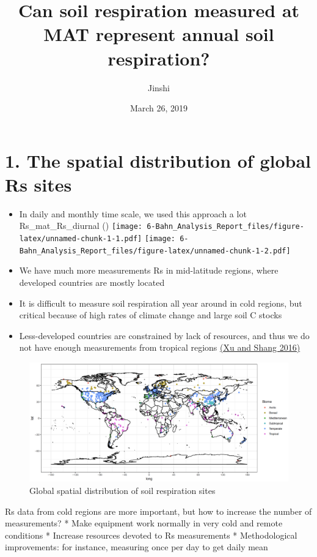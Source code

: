 \documentclass[]{article}
\title{Can soil respiration measured at MAT represent annual soil respiration?}
\author{Jinshi}
\date{March 26, 2019}
\begin{document}
\maketitle

\hypertarget{the-spatial-distribution-of-global-rs-sites}{%
\section{1. The spatial distribution of global Rs
sites}\label{the-spatial-distribution-of-global-rs-sites}}

\begin{itemize}
\item
  In daily and monthly time scale, we used this approach a lot
  Rs\_mat\_Rs\_diurnal ()
  \texttt{[image: 6-Bahn\_Analysis\_Report\_files/figure-latex/unnamed-chunk-1-1.pdf]}
  \texttt{[image: 6-Bahn\_Analysis\_Report\_files/figure-latex/unnamed-chunk-1-2.pdf]}
\item
  We have much more measurements Rs in mid-latitude regions, where
  developed countries are mostly located
\item
  It is difficult to measure soil respiration all year around in cold
  regions, but critical because of high rates of climate change and
  large soil C stocks
\item
  Less-developed countries are constrained by lack of resources, and
  thus we do not have enough measurements from tropical regions
  \href{http://dx.doi.org/10.1016/j.jplph.2016.08.007}{(Xu and Shang
  2016)}
\end{itemize}

\begin{figure}
\centering
\includegraphics{SRDB_V4_Fig1.png}
\caption{Global spatial distribution of soil respiration sites}
\end{figure}

Rs data from cold regions are more important, but how to increase the
number of measurements? * Make equipment work normally in very cold and
remote conditions * Increase resources devoted to Rs measurements *
Methodological improvements: for instance, measuring once per day to get
daily mean
\end{document}
